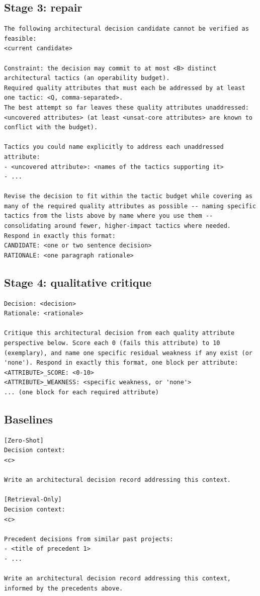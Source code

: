 \documentclass[preprint,12pt,authoryear]{elsarticle}
\renewcommand{\_}{\textunderscore\allowbreak{}}
\begin{document}
\subsection{Stage 3: repair}
\begin{lstlisting}
The following architectural decision candidate cannot be verified as feasible:
<current candidate>

Constraint: the decision may commit to at most <B> distinct architectural tactics (an operability budget).
Required quality attributes that must each be addressed by at least one tactic: <Q, comma-separated>.
The best attempt so far leaves these quality attributes unaddressed: <uncovered attributes> (at least <unsat-core attributes> are known to conflict with the budget).

Tactics you could name explicitly to address each unaddressed attribute:
- <uncovered attribute>: <names of the tactics supporting it>
- ...

Revise the decision to fit within the tactic budget while covering as many of the required quality attributes as possible -- naming specific tactics from the lists above by name where you use them -- consolidating around fewer, higher-impact tactics where needed. Respond in exactly this format:
CANDIDATE: <one or two sentence decision>
RATIONALE: <one paragraph rationale>
\end{lstlisting}

\subsection{Stage 4: qualitative critique}
\begin{lstlisting}
Decision: <decision>
Rationale: <rationale>

Critique this architectural decision from each quality attribute perspective below. Score each 0 (fails this attribute) to 10 (exemplary), and name one specific residual weakness if any exist (or 'none'). Respond in exactly this format, one block per attribute:
<ATTRIBUTE>_SCORE: <0-10>
<ATTRIBUTE>_WEAKNESS: <specific weakness, or 'none'>
... (one block for each required attribute)
\end{lstlisting}

\subsection{Baselines}
\begin{lstlisting}
[Zero-Shot]
Decision context:
<c>

Write an architectural decision record addressing this context.

[Retrieval-Only]
Decision context:
<c>

Precedent decisions from similar past projects:
- <title of precedent 1>
- ...

Write an architectural decision record addressing this context, informed by the precedents above.
\end{lstlisting}



\end{document}
